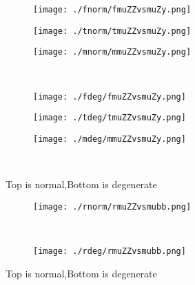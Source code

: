 \documentclass[aps,floats,floatfix,nofootinbib]{revtex4-1}
\begin{document}
\begin{center}
\begin{figure}
\begin{subfigure}{0.3\textwidth}
\texttt{[image: ./fnorm/fmuZZvsmuZy.png]}
\label{}
\end{subfigure}
\begin{subfigure}{0.3\textwidth}
\texttt{[image: ./tnorm/tmuZZvsmuZy.png]}
\label{}
\end{subfigure}
\begin{subfigure}{0.3\textwidth}
\texttt{[image: ./mnorm/mmuZZvsmuZy.png]}
\label{}
\end{subfigure}\\
\begin{subfigure}{0.3\textwidth}
\texttt{[image: ./fdeg/fmuZZvsmuZy.png]}
\label{}
\end{subfigure}
\begin{subfigure}{0.3\textwidth}
\texttt{[image: ./tdeg/tmuZZvsmuZy.png]}
\label{}
\end{subfigure}
\begin{subfigure}{0.3\textwidth}
\texttt{[image: ./mdeg/mmuZZvsmuZy.png]}
\label{}
\end{subfigure}\\
\caption{Top is normal,Bottom is degenerate}
\end{figure}
\end{center}

\begin{center}
\begin{figure}
\begin{subfigure}{0.95\textwidth}
\texttt{[image: ./rnorm/rmuZZvsmubb.png]}
\label{}
\end{subfigure}\\
\begin{subfigure}{0.95\textwidth}
\texttt{[image: ./rdeg/rmuZZvsmubb.png]}
\label{}
\end{subfigure}
\caption{Top is normal,Bottom is degenerate}
\end{figure}
\end{center}
\end{document}
